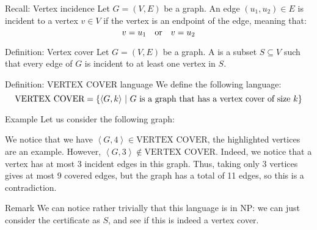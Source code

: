\documentclass[a4paper]{article}
\begin{document}
\begin{parag}{Recall: Vertex incidence}
    Let $G = \left(V, E\right)$ be a graph. An edge $\left(u_1, u_2\right) \in E$ is incident to a vertex $v \in V$ if the vertex is an endpoint of the edge, meaning that:
    \[v = u_1 \quad \text{or} \quad v = u_2\]
\end{parag}


\begin{parag}{Definition: Vertex cover}
    Let $G = \left(V, E\right)$ be a graph. A  is a subset $S \subseteq V$ such that every edge of $G$ is incident to at least one vertex in $S$.
\end{parag}

\begin{parag}{Definition: VERTEX COVER language}
    We define the following language: 
    \[\text{VERTEX COVER} = \left\{\left\langle G, k \right\rangle \suchthat \text{$G$ is a graph that has a vertex cover of size $k$}\right\}\]
    
    \begin{subparag}{Example}
        Let us consider the following graph:

        We notice that we have $\left\langle G, 4 \right\rangle \in \text{VERTEX COVER}$, the highlighted vertices are an example. However, $\left\langle G, 3 \right\rangle \not \in \text{VERTEX COVER}$. Indeed, we notice that a vertex has at most 3 incident edges in this graph. Thus, taking only 3 vertices gives at most 9 covered edges, but the graph has a total of 11 edges, so this is a contradiction.
    \end{subparag}

    \begin{subparag}{Remark}
        We can notice rather trivially that this language is in NP: we can just consider the certificate as $S$, and see if this is indeed a vertex cover.
    \end{subparag}
\end{parag}
\end{document}
